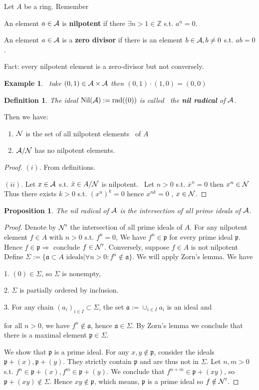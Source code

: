 \documentclass[11pt]{article}
\newtheorem{prop}[thm]{Proposition}
\newtheorem{dfn}[thm]{Definition}
\newtheorem{ex}[thm]{Example}
\newcommand{\intg}{\mathbb Z}
\newcommand{\sca}{{\mathfrak a}}
\newcommand{\scp}{{\mathfrak p}}
\newcommand{\cala}{{\cal A}}
\newcommand{\caln}{{\cal N}}
\newcommand{\Lrta}{\Longrightarrow}
\begin{document}
Let $A$ be a ring.
Remember 

    An element $a\in \cala$ is \textbf{nilpotent} if there $\exists n>1\in \intg$ s.t. $a^n=0$.

    An element $a\in \cala$ is a \textbf{zero divisor} if there is an element $b\in \cala, b\neq 0$ s.t. $ab=0$.

Fact: every nilpotent element is a zero-divisor  but not conversely.

\begin{ex}
     take $(0,1)\in \cala\times \cala$ then $(0,1)\cdot(1,0) =(0,0)$
\end{ex}

\begin{dfn}
 The ideal $\text{Nil}(\cala):=\text{rad}((0))$ is called  the \textbf{nil radical} of $\cala$.
\end{dfn}

Then we have:
\begin{enumerate}[label=(\roman*)]
\item $\caln$ is the set of all nilpotent elements  of $A$
\item $\cala/\caln$ has no nilpotent elements.
\end{enumerate}
\begin{proof}
$(i)$. From definitions.

$(ii)$. Let $x\in \cala$ s.t. $\bar{x}\in A/\caln$ is nilpotent.
 Let $n>0$ s.t. $\bar{x}^n=0$ then $x^n \in \caln$
Thus there exists $k>0$ s.t. $(x^n)^k=0$ hence $x^{nk}=0$
, $x\in \caln$.
\end{proof}

\begin{prop}
The nil radical of $\cala$ is the intersection of all prime ideals of $\cala$.
\end{prop}
\begin{proof}
Denote by $\caln'$ the intersection of all prime ideals of $A$.
For any nilpotent element $f\in A$ with $n>0$ s.t. $f^n=0$,
We have $f^n\in \scp$ for every prime ideal $\scp$. Hence $f\in \scp\Lrta$ conclude $f\in \caln'$.
Conversely, suppose $f\in A$ is not nilpotent 
Define $\Sigma:=\{ \sca \subset A\text{ ideals} | \forall n>0: f^n\notin \sca\}$.
We will apply Zorn's lemma. 
We have 

    1.  $(0)\in \Sigma$, so $\Sigma$ is nonempty,

    2.  $\Sigma$ is partially ordered by inclusion.

    3.  For any chain $(a_i)_{i\in I}\subset \Sigma$, the set $\sca :=\cup_{i\in I}a_i$ is an ideal and 

    for all $n>0$, 
    we have $f^n \notin \sca$, hence $\sca \in \Sigma$.
By Zorn's lemma we conclude that there is a maximal element $\scp\in \Sigma$.

We show that $\scp$ is a prime ideal.
For any $x,y \notin \scp$, consider the ideals
$\scp+(x), \scp+(y)$. They strictly contain $\scp$ and are thus not in $\Sigma$.
Let $n,m>0$ s.t. $f^n\in \scp+(x), f^m\in \scp+(y)$.
We conclude that $f^{n+m}\in \scp+(xy)$, so $\scp+(xy) \notin \Sigma$.
Hence $xy \notin \scp$, which means, $\scp $ is a prime ideal so $f \notin \caln'$.
\end{proof}
\end{document}

